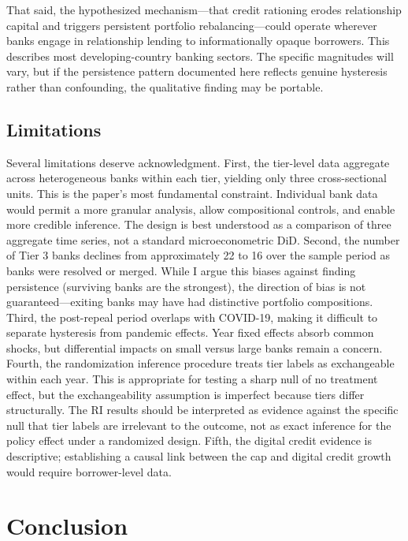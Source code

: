 \documentclass[12pt]{article}
\begin{document}
That said, the hypothesized mechanism---that credit rationing erodes relationship capital and triggers persistent portfolio rebalancing---could operate wherever banks engage in relationship lending to informationally opaque borrowers. This describes most developing-country banking sectors. The specific magnitudes will vary, but if the persistence pattern documented here reflects genuine hysteresis rather than confounding, the qualitative finding may be portable.

\subsection{Limitations}

Several limitations deserve acknowledgment. First, the tier-level data aggregate across heterogeneous banks within each tier, yielding only three cross-sectional units. This is the paper's most fundamental constraint. Individual bank data would permit a more granular analysis, allow compositional controls, and enable more credible inference. The design is best understood as a comparison of three aggregate time series, not a standard microeconometric DiD. Second, the number of Tier 3 banks declines from approximately 22 to 16 over the sample period as banks were resolved or merged. While I argue this biases against finding persistence (surviving banks are the strongest), the direction of bias is not guaranteed---exiting banks may have had distinctive portfolio compositions. Third, the post-repeal period overlaps with COVID-19, making it difficult to separate hysteresis from pandemic effects. Year fixed effects absorb common shocks, but differential impacts on small versus large banks remain a concern. Fourth, the randomization inference procedure treats tier labels as exchangeable within each year. This is appropriate for testing a sharp null of no treatment effect, but the exchangeability assumption is imperfect because tiers differ structurally. The RI results should be interpreted as evidence against the specific null that tier labels are irrelevant to the outcome, not as exact inference for the policy effect under a randomized design. Fifth, the digital credit evidence is descriptive; establishing a causal link between the cap and digital credit growth would require borrower-level data.


\section{Conclusion}
\label{sec:conclusion}
\end{document}
